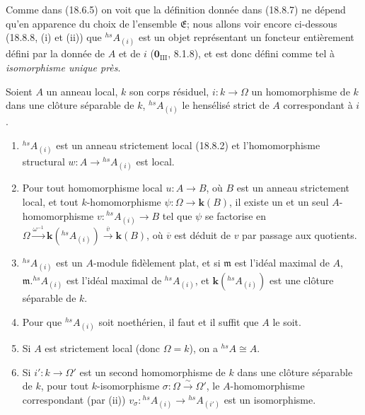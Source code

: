 Comme dans (18.6.5) on voit que la définition donnée dans (18.8.7) ne dépend qu'en apparence du choix de l'ensemble $\mathfrak E$; nous allons voir encore ci-dessous (18.8.8, (i) et (ii)) que ${}^{hs}\!A_{(i)}$ est un objet représentant un foncteur entièrement défini par la donnée de $A$ et de $i$ ($\mathbf{0}_{\mathrm{III}}$, 8.1.8), et est donc défini comme tel à \emph{isomorphisme unique près}.

\begin{proposition}[18.8.8]
\label{IV.18.8.8}
Soient $A$ un anneau local, $k$ son corps résiduel, $i:k\to\Omega$ un homomorphisme de $k$ dans une clôture séparable de $k$, ${}^{hs}\!A_{(i)}$ le hensélisé strict de $A$ correspondant à $i$.
\begin{enumerate}
  \item[\textup{(i)}] ${}^{hs}\!A_{(i)}$ est un anneau strictement local \textup{(18.8.2)} et l'homomorphisme structural $w:A\to{}^{hs}\!A_{(i)}$ est local.
  \item[\textup{(ii)}] Pour tout homomorphisme local $u:A\to B$, où $B$ est un anneau strictement local, et tout $k$-homomorphisme $\psi:\Omega\to\boldsymbol{k}(B)$, il existe un et un seul $A$-homomorphisme $v:{}^{hs}\!A_{(i)}\to B$ tel que $\psi$ se factorise en $\Omega\xrightarrow{\omega^{-1}}\boldsymbol{k}({}^{hs}\!A_{(i)})\xrightarrow{\overline v}\boldsymbol{k}(B)$, où $\overline v$ est déduit de $v$ par passage aux quotients.


  \item[\textup{(iii)}] ${}^{hs}\!A_{(i)}$ est un $A$-module fidèlement plat, et si $\mathfrak m$ est l'idéal maximal de $A$, $\mathfrak m.{}^{hs}\!A_{(i)}$ est l'idéal maximal de ${}^{hs}\!A_{(i)}$, et $\boldsymbol{k}({}^{hs}\!A_{(i)})$ est une clôture séparable de $k$.
  \item[\textup{(iv)}] Pour que ${}^{hs}\!A_{(i)}$ soit noethérien, il faut et il suffit que $A$ le soit.
  \item[\textup{(v)}] Si $A$ est strictement local (donc $\Omega=k$), on a ${}^{hs}\!A\cong A$.
  \item[\textup{(vi)}] Si $i':k\to\Omega'$ est un second homomorphisme de $k$ dans une clôture séparable de $k$, pour tout $k$-isomorphisme $\sigma:\Omega\xrightarrow{\sim}\Omega'$, le $A$-homomorphisme correspondant \textup{(}par \textup{(ii))} $v_\sigma:{}^{hs}\!A_{(i)}\to{}^{hs}\!A_{(i')}$ est un isomorphisme.
\end{enumerate}
\end{proposition}

